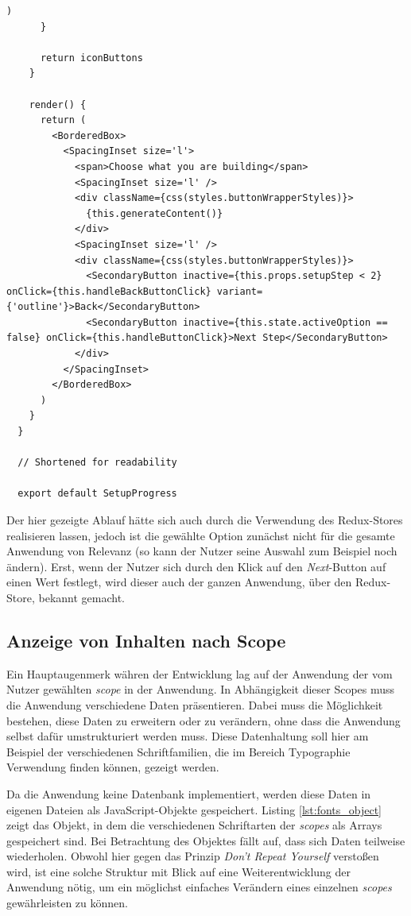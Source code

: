 \begin{lstlisting}[caption=Die Komponente \texttt{SetupProgress} in gekürzter Form, label=lst:setup]
        )
      }

      return iconButtons
    }

    render() {
      return (
        <BorderedBox>
          <SpacingInset size='l'>
            <span>Choose what you are building</span>
            <SpacingInset size='l' />
            <div className={css(styles.buttonWrapperStyles)}>
              {this.generateContent()}
            </div>
            <SpacingInset size='l' />
            <div className={css(styles.buttonWrapperStyles)}>
              <SecondaryButton inactive={this.props.setupStep < 2} onClick={this.handleBackButtonClick} variant={'outline'}>Back</SecondaryButton>
              <SecondaryButton inactive={this.state.activeOption == false} onClick={this.handleButtonClick}>Next Step</SecondaryButton>
            </div>
          </SpacingInset>
        </BorderedBox>
      )
    }
  }

  // Shortened for readability

  export default SetupProgress
\end{lstlisting}

Der hier gezeigte Ablauf hätte sich auch durch die Verwendung des Redux-Stores realisieren lassen, jedoch ist die gewählte Option zunächst nicht für die gesamte Anwendung von Relevanz (so kann der Nutzer seine Auswahl zum Beispiel noch ändern). Erst, wenn der Nutzer sich durch den Klick auf den \textit{Next}-Button auf einen Wert festlegt, wird dieser auch der ganzen Anwendung, über den Redux-Store, bekannt gemacht.

\subsection{Anzeige von Inhalten nach Scope}
\label{chap:display_scope}
Ein Hauptaugenmerk währen der Entwicklung lag auf der Anwendung der vom Nutzer gewählten \textit{scope} in der Anwendung. In Abhängigkeit dieser Scopes muss die Anwendung verschiedene Daten präsentieren. Dabei muss die Möglichkeit bestehen, diese Daten zu erweitern oder zu verändern, ohne dass die Anwendung selbst dafür umstrukturiert werden muss. Diese Datenhaltung soll hier am Beispiel der verschiedenen Schriftfamilien, die im Bereich Typographie Verwendung finden können, gezeigt werden.

Da die Anwendung keine Datenbank implementiert, werden diese Daten in eigenen Dateien als JavaScript-Objekte gespeichert. Listing \ref{lst:fonts_object} zeigt das Objekt, in dem die verschiedenen Schriftarten der \textit{scopes} als Arrays gespeichert sind. Bei Betrachtung des Objektes fällt auf, dass sich Daten teilweise wiederholen. Obwohl hier gegen das Prinzip \textit{Don’t Repeat Yourself} verstoßen wird, ist eine solche Struktur mit Blick auf eine Weiterentwicklung der Anwendung nötig, um ein möglichst einfaches Verändern eines einzelnen \textit{scopes} gewährleisten zu können.

